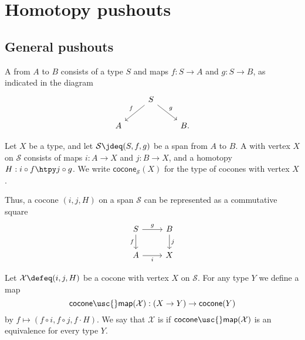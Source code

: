 \chapter{Homotopy pushouts}

\section{General pushouts}

\begin{defn}
A  from $A$ to $B$ consists of a type $S$ and maps $f:S\to A$ and $g:S\to B$, as indicated in the diagram
\begin{equation*}
\begin{tikzcd}
& S \arrow[dl,swap,"f"] \arrow[dr,"g"] \\
A & & B.
\end{tikzcd}
\end{equation*}
\end{defn}

\begin{defn}
Let $X$ be a type, and let $\mathcal{S}\jdeq (S,f,g)$ be a span from $A$ to $B$.
A  with vertex $X$ on $\mathcal{S}$ consists of maps $i:A\to X$ and $j:B\to X$, and a homotopy $H:i\circ f\htpy j\circ g$.
We write $\mathsf{cocone}_{\mathcal{S}}(X)$ for the type of cocones with vertex $X$.
\end{defn}

Thus, a cocone $(i,j,H)$ on a span $\mathcal{S}$ can be represented as a commutative square
\begin{equation*}
\begin{tikzcd}
S \arrow[r,"g"] \arrow[d,swap,"f"] & B \arrow[d,"j"] \\
A \arrow[r,swap,"i"] & X 
\end{tikzcd}
\end{equation*}

\begin{defn}
Let $\mathcal{X}\defeq(i,j,H)$ be a cocone with vertex $X$ on $\mathcal{S}$. For any type $Y$ we define a map
\begin{equation*}
\mathsf{cocone\usc{}map}(\mathcal{X}):(X\to Y)\to \mathsf{cocone}(Y)
\end{equation*}
by $f\mapsto (f\circ i,f\circ j,f\cdot H)$. We say that $\mathcal{X}$ is  if $\mathsf{cocone\usc{}map}(\mathcal{X})$ is an equivalence for every type $Y$. 
\end{defn}

